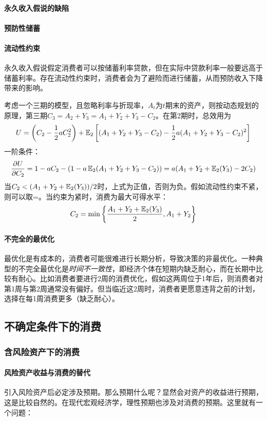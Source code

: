 \paragraph*{永久收入假说的缺陷}

\paragraph*{预防性储蓄}

\paragraph*{流动性约束}永久收入假说假定消费者可以按储蓄利率贷款，但在实际中贷款利率一般要远高于储蓄利率。存在流动性约束时，消费者会为了避险而进行储蓄，从而预防收入下降带来的影响。

考虑一个三期的模型，且忽略利率与折现率，$A_t$为$t$期末的资产，则按动态规划的原理，第三期$C_3=A_2+Y_3=A_1+Y_2+Y_3-C_2$。在第2期时，总效用为
$$U=\left(C_2-\frac{1}{2}aC_2^2\right)+\operatorname{\mathbb{E}}_2\left[(A_1+Y_2+Y_3-C_2)-\frac{1}{2}a(A_1+Y_2+Y_3-C_2)^2\right]$$
一阶条件：
$$\pdv{U}{C_2}=1-aC_2-(1-a\operatorname{\mathbb{E}}_2(A_1+Y_2+Y_3-C_2))=a(A_1+Y_2+\operatorname{\mathbb{E}}_2(Y_3)-2C_2)$$
当$C_2<(A_1+Y_2+\operatorname{\mathbb{E}}_2(Y_3))/2$时，上式为正值，否则为负。假如流动性约束不紧，则可以取=。当约束为紧时，消费为最大可得水平：
$$C_2=\min \left\{\frac{A_1+Y_2+\operatorname{\mathbb{E}}_2(Y_3)}{2},A_1+Y_2\right\}$$

\paragraph*{不完全的最优化}最优化是有成本的，消费者可能很难进行长期分析，导致决策的非最优化。一种典型的不完全最优化是\emph{时间不一致性}，即{\kaishu 经济个体在短期内缺乏耐心，而在长期中比较有耐心。}比如消费者要进行2周的消费优化，假如这两周位于1年后，则消费者对第1周与第2周通常没有偏好。但当临近这2周时，消费者更愿意违背之前的计划，选择在每1周消费更多（缺乏耐心）。



\subsection{不确定条件下的消费}
\subsubsection{含风险资产下的消费}
\paragraph*{风险资产收益与消费的替代}引入风险资产后必定涉及预期。那么预期什么呢？显然会对资产的收益进行预期，这是比较自然的。在现代宏观经济学，理性预期也涉及对消费的预期。这里就有一个问题：

